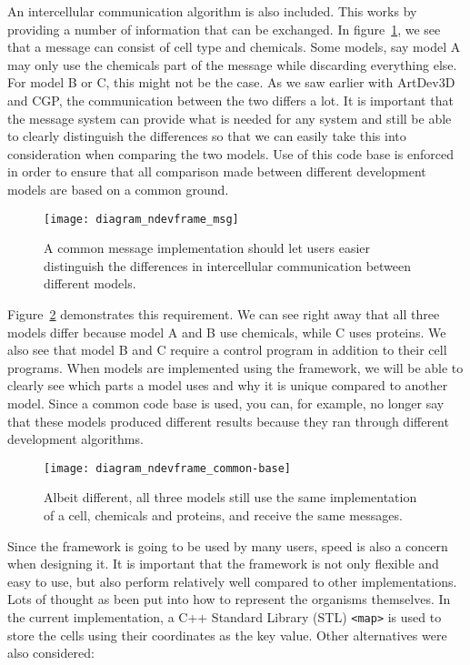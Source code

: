 An intercellular communication algorithm is also included. This works by providing a number of information that can be exchanged. In figure~\ref{fig:diagram_ndevframe_msg}, we see that a message can consist of cell type and chemicals. Some models, say model A may only use the chemicals part of the message while discarding everything else. For model B or C, this might not be the case. As we saw earlier with ArtDev3D and CGP, the communication between the two differs a lot. It is important that the message system can provide what is needed for any system and still be able to clearly distinguish the differences so that we can easily take this into consideration when comparing the two models. Use of this code base is enforced in order to ensure that all comparison made between different development models are based on a common ground.

\begin{figure}[!ht]
	\centering
	\texttt{[image: diagram\_ndevframe\_msg]}
	\caption{A common message implementation should let users easier distinguish the differences in intercellular communication between different models.}
	\label{fig:diagram_ndevframe_msg}
\end{figure}

Figure~\ref{fig:diagram_ndevframe_common-base} demonstrates this requirement. We can see right away that all three models differ because model A and B use chemicals, while C uses proteins. We also see that model B and C require a control program in addition to their cell programs. When models are implemented using the framework, we will be able to clearly see which parts a model uses and why it is unique compared to another model. Since a common code base is used, you can, for example, no longer say that these models produced different results because they ran through different development algorithms.

\begin{figure}[!ht]
	\centering
	\texttt{[image: diagram\_ndevframe\_common-base]}
	\caption{Albeit different, all three models still use the same implementation of a cell, chemicals and proteins, and receive the same messages.}
	\label{fig:diagram_ndevframe_common-base}
\end{figure}

Since the framework is going to be used by many users, speed is also a concern when designing it. It is important that the framework is not only flexible and easy to use, but also perform relatively well compared to other implementations. Lots of thought as been put into how to represent the organisms themselves. In the current implementation, a C++ Standard Library (STL) \texttt{<map>} is used to store the cells using their coordinates as the key value. Other alternatives were also considered:

